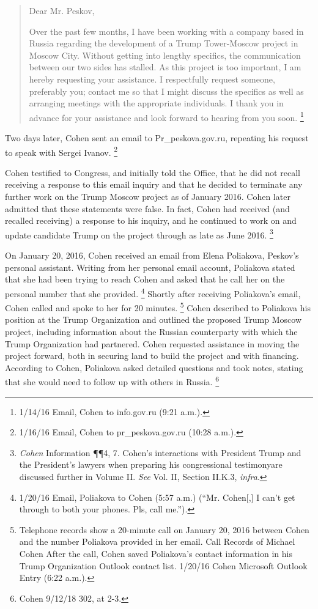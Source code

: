\begin{quote}
Dear Mr. Peskov,

Over the past few months, I have been working with a company based in Russia regarding the development of a Trump Tower-Moscow project in Moscow City.
Without getting into lengthy specifics, the communication between our two sides has stalled.
As this project is too important, I am hereby requesting your assistance.
I respectfully request someone, preferably you; contact me so that I might discuss the specifics as well as arranging meetings with the appropriate individuals.
I thank you in advance for your assistance and look forward to hearing from you soon.%
\footnote{1/14/16 Email, Cohen to info\@prpress.gov.ru (9:21 a.m.).}
\end{quote}

Two days later, Cohen sent an email to Pr\_peskova\@prpress.gov.ru, repeating his request to speak with Sergei Ivanov.%
\footnote{1/16/16 Email, Cohen to pr\_peskova\@prpress.gov.ru (10:28 a.m.).}

Cohen testified to Congress, and initially told the Office, that he did not recall receiving a response to this email inquiry and that he decided to terminate any further work on the Trump Moscow project as of January 2016.
Cohen later admitted that these statements were false.
In fact, Cohen had received (and recalled receiving) a response to his inquiry, and he continued to work on and update candidate Trump on the project through as late as June 2016.%
\footnote{\textit{Cohen} Information \P\P 4, 7.
Cohen’s interactions with President Trump and the President’s lawyers when preparing his congressional testimonyare discussed further in Volume II.
\textit{See} Vol. II, Section II.K.3, \textit{infra}.}

On January 20, 2016, Cohen received an email from Elena Poliakova, Peskov's personal assistant.
Writing from her personal email account, Poliakova stated that she had been trying to reach Cohen and asked that he call her on the personal number that she provided.%
\footnote{1/20/16 Email, Poliakova to Cohen (5:57 a.m.)
(“Mr. Cohen[,] I can’t get through to both your phones. Pls, call me.”).}
Shortly after receiving Poliakova's email, Cohen called and spoke to her for 20 minutes.%
\footnote{Telephone records show a 20-minute call on January 20, 2016 between Cohen and the number Poliakova provided in her email.
Call Records of Michael Cohen 
After the call, Cohen saved Poliakova’s contact information in his Trump Organization Outlook contact list.
1/20/16 Cohen Microsoft Outlook Entry (6:22 a.m.).}
Cohen described to Poliakova his position at the Trump Organization and outlined the proposed Trump Moscow project, including information about the Russian counterparty with which the Trump Organization had partnered.
Cohen requested assistance in moving the project forward, both in securing land to build the project and with financing.
According to Cohen, Poliakova asked detailed questions and took notes, stating that she would need to follow up with others in Russia.%
\footnote{Cohen 9/12/18 302, at 2-3.}

